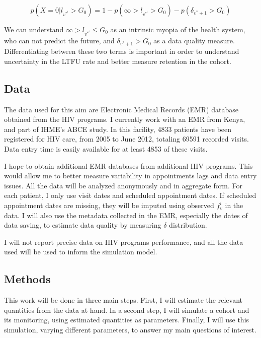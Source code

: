 $$p(X = 0 | l_{v^{*}^i} >  G_0) = 1 - p(\infty > l_{v^{*}^i} >  G_0) - p(\delta_{v^*+1} > G_0) $$

We can understand $\infty > l_{v^{*}^i} \leq  G_0$ as an intrinsic myopia of the health system, who can not predict the future, and $\delta_{v^*+1} > G_0$ as a data quality measure. Differentiating between these two terms is  important in order to understand uncertainty in the LTFU rate and better measure retention in the cohort.

\subsection{Data}

The data used for this aim are Electronic Medical Records (EMR) database obtained from the HIV programs. I currently work with an EMR from  Kenya, and part of IHME's ABCE study. In this facility, 4833 patients have been registered for HIV care, from 2005 to June 2012, totaling 69591 recorded visits. Data entry time is easily available for at least 4853 of these visits.


I hope to obtain additional EMR databases from additional HIV programs. This would allow me to better measure variability in appointments lags and data entry issues. All the data will be analyzed anonymously and in aggregate form. For each patient, I only use visit dates and scheduled appointment dates. If scheduled appointment dates are missing, they will be imputed using observed $f^i_v$ in the data. I will also use the metadata collected in the EMR, especially the dates of data saving, to estimate data quality by measuring $\delta$ distribution.

I will not report precise data on HIV programs performance, and all the data used will be used to inform the simulation model.

\subsection{Methods}

This work will be done in three main steps. First, I will estimate the relevant quantities from the data at hand. In a second step, I will simulate a cohort and its monitoring, using estimated quantities as parameters. Finally, I will use this simulation, varying different parameters, to answer my main questions of interest.

